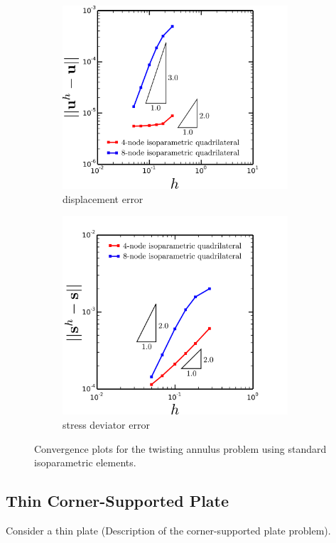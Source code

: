 \begin{figure}[!h]
  \centering
    \begin{subfigure}[b]{0.49\linewidth}
            \centering
            \includegraphics[width=3.3in]{figures/quad_l2_error.pdf}
    			\caption{displacement error \label{fig:quad_l2_error}}
    \end{subfigure}
	\begin{subfigure}[b]{0.49\linewidth}
            \centering
            \includegraphics[width=3.3in]{figures/quad_h1_error.pdf}
    			\caption{stress deviator error \label{fig:quad_h1_error}}
    \end{subfigure} \caption{Convergence plots for the twisting annulus problem using standard isoparametric elements.}
  \label{fig:quad_error}
\end{figure}

\subsection*{Thin Corner-Supported Plate}

Consider a thin plate 
(Description of the corner-supported plate problem).

